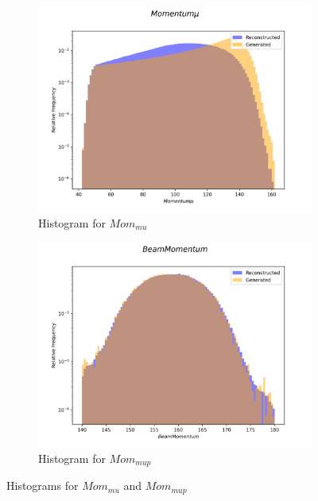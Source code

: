 \documentclass{article}
\begin{document}
\begin{figure}[H]
    \centering
    \begin{subfigure}[b]{0.45\textwidth}
        \includegraphics[width=\textwidth]{graphs/hadr_Momentum_mu.png}
        \caption{Histogram for $Mom_{mu}$}
        \label{fig:had_Momentum_mu}
    \end{subfigure}
    \hfill
    \begin{subfigure}[b]{0.45\textwidth}
        \includegraphics[width=\textwidth]{graphs/hadr_Beam_Momentum.png}
        \caption{Histogram for $Mom_{mup}$}
        \label{fig:had_Momentum_mup}
    \end{subfigure}
    \caption{Histograms for $Mom_{mu}$ and $Mom_{mup}$}
\end{figure}
\end{document}
